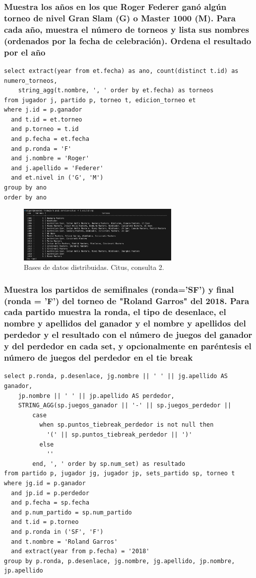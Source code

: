\subsubsection{Muestra los años en los que Roger Federer ganó algún torneo de nivel Gran Slam (G) o Master 1000 (M). Para cada año, muestra el número de torneos y lista sus nombres (ordenados por la fecha de celebración). Ordena el resultado por el año}

\begin{verbatim}
select extract(year from et.fecha) as ano, count(distinct t.id) as numero_torneos, 
	string_agg(t.nombre, ', ' order by et.fecha) as torneos
from jugador j, partido p, torneo t, edicion_torneo et
where j.id = p.ganador
  and t.id = et.torneo
  and p.torneo = t.id
  and p.fecha = et.fecha
  and p.ronda = 'F'
  and j.nombre = 'Roger'
  and j.apellido = 'Federer'
  and et.nivel in ('G', 'M')
group by ano
order by ano
\end{verbatim}

\begin{figure}[H]
\centering
\includegraphics[width=0.7\textwidth]{fotos/citus/q2.png}
\caption{Bases de datos distribuidas. Citus, consulta 2.}
\label{fig:q2_citus}
\end{figure}




\subsubsection{Muestra los partidos de semifinales (ronda='SF') y ﬁnal (ronda = 'F') del torneo de "Roland Garros" del 2018. Para cada partido muestra la ronda, el tipo de desenlace, el nombre y apellidos del ganador y el nombre y apellidos del perdedor y el resultado con el número de juegos del ganador y del perdedor en cada set, y opcionalmente en paréntesis el número de juegos del perdedor en el tie break}

\begin{verbatim}
select p.ronda, p.desenlace, jg.nombre || ' ' || jg.apellido AS ganador, 
	jp.nombre || ' ' || jp.apellido AS perdedor, 
	STRING_AGG(sp.juegos_ganador || '-' || sp.juegos_perdedor ||
		case
		  when sp.puntos_tiebreak_perdedor is not null then 
		  	'(' || sp.puntos_tiebreak_perdedor || ')'
		  else 
		  	'' 
		end, ', ' order by sp.num_set) as resultado
from partido p, jugador jg, jugador jp, sets_partido sp, torneo t
where jg.id = p.ganador
  and jp.id = p.perdedor
  and p.fecha = sp.fecha
  and p.num_partido = sp.num_partido
  and t.id = p.torneo
  and p.ronda in ('SF', 'F')
  and t.nombre = 'Roland Garros'
  and extract(year from p.fecha) = '2018'
group by p.ronda, p.desenlace, jg.nombre, jg.apellido, jp.nombre, jp.apellido
\end{verbatim}

